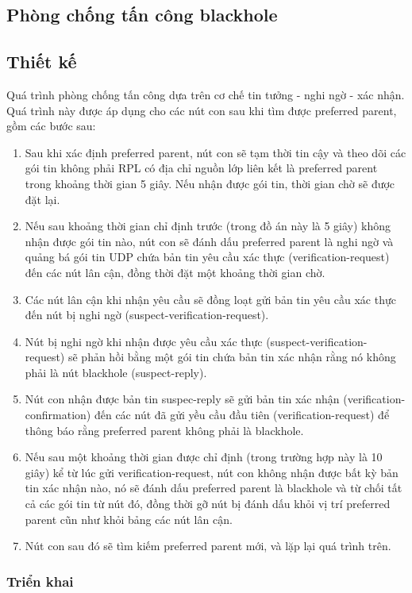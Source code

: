 \subsection{Phòng chống tấn công blackhole}
\label{prevention:blackhole}
\subsection{Thiết kế}
Quá trình phòng chống tấn công dựa trên cơ chế tin tưởng - nghi ngờ - xác nhận. Quá trình này được áp dụng cho các nút con sau khi tìm được preferred parent, gồm các bước sau:

\begin{enumerate}
    \item Sau khi xác định preferred parent, nút con sẽ tạm thời tin cậy và theo dõi các gói tin không phải RPL có địa chỉ nguồn lớp liên kết là preferred parent trong khoảng thời gian 5 giây. Nếu nhận được gói tin, thời gian chờ sẽ được đặt lại.
    \item Nếu sau khoảng thời gian chỉ định trước (trong đồ án này là 5 giây) không nhận được gói tin nào, nút con sẽ đánh dấu preferred parent là nghi ngờ và quảng bá gói tin UDP chứa bản tin yêu cầu xác thực (verification-request) đến các nút lân cận, đồng thời đặt một khoảng thời gian chờ.
    \item Các nút lân cận khi nhận yêu cầu sẽ đồng loạt gửi bản tin yêu cầu xác thực đến nút bị nghi ngờ (suspect-verification-request).
    \item Nút bị nghi ngờ khi nhận được yêu cầu xác thực (suspect-verification-request) sẽ phản hồi bằng một gói tin chứa bản tin xác nhận rằng nó không phải là nút blackhole (suspect-reply).
    \item Nút con nhận được bản tin suspec-reply sẽ gửi bản tin xác nhận (verification-confirmation) đến các nút đã gửi yều cầu đầu tiên (verification-request) để thông báo rằng preferred parent không phải là blackhole.
    \item Nếu sau một khoảng thời gian được chỉ định (trong trường hợp này là 10 giây) kể từ lúc gửi verification-request, nút con không nhận được bất kỳ bản tin xác nhận nào, nó sẽ đánh dấu preferred parent là blackhole và từ chối tất cả các gói tin từ nút đó, đồng thời gỡ nút bị đánh dấu khỏi vị trí preferred parent cũn như khỏi bảng các nút lân cận.
    \item Nút con sau đó sẽ tìm kiếm preferred parent mới, và lặp lại quá trình trên.
\end{enumerate}

\subsubsection{Triển khai}

